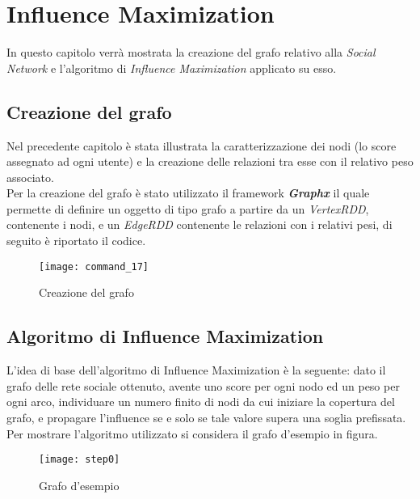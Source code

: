 
\chapter{Influence Maximization}
In questo capitolo verrà mostrata la creazione del grafo relativo alla \textit{Social Network}
e l'algoritmo di \textit{Influence Maximization} applicato su esso.

\section{Creazione del grafo}
Nel precedente capitolo è stata illustrata la caratterizzazione dei nodi (lo score
assegnato ad ogni utente) e la creazione delle relazioni tra esse con il relativo
peso associato.\\
Per la creazione del grafo è stato utilizzato il framework \textit{\textbf{Graphx}}
il quale permette di definire un oggetto di tipo grafo a partire da un \textit{VertexRDD},
contenente i nodi, e un \textit{EdgeRDD} contenente le relazioni con i relativi pesi,
di seguito è riportato il codice.

\begin{figure}[!htbp]
	\texttt{[image: command\_17]}
	\caption{Creazione del grafo}
	\label{command_17}
\end{figure}
\clearpage
\section{Algoritmo di Influence Maximization}
L'idea di base dell'algoritmo di Influence Maximization è la seguente: dato il
grafo delle rete sociale ottenuto, avente uno score per ogni nodo ed un peso per
ogni arco, individuare un numero finito di nodi da cui iniziare la copertura del
grafo, e propagare l'influence se e solo se tale valore  supera una soglia prefissata.\\
Per mostrare l'algoritmo utilizzato si considera il grafo d'esempio in figura.

\begin{figure}[!htbp]
  \begin{center}
    \texttt{[image: step0]}
  	\caption{Grafo d'esempio}
  	\label{step0}
  \end{center}
\end{figure}

